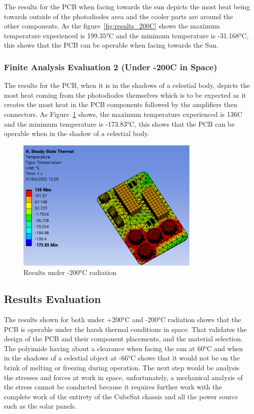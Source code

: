 The results for the PCB when facing towards the sun
depicts the most heat being towards outside of the photodiodes area and
the cooler parts are around the other components. As the figure~\ref{fig:results_200C}
shows the maximum temperature experienced is 199.35°C and the minimum
temperature is -31.168°C, this shows that the PCB can be operable when
facing towards the Sun.




\subsubsection{Finite Analysis Evaluation 2 (Under -200C in Space)}

The results for the PCB, when it is in the shadows of a celestial body, depicts the most heat coming from the photodiodes themselves which is to be expected as it creates the most heat in the PCB components followed by the amplifiers then connectors. As Figure~\ref{fig:results_minus_200C}  shows, the maximum temperature experienced is 136C and the minimum temperature is -173.83°C, this shows that the PCB can be operable when in the shadow of a celestial body.

\begin{figure}[htbp]
    \centering
    \includegraphics[width=0.8\textwidth]{chapters/methodology/ThermalAnalysis/Fig3underneg200c.png}
    \caption{Results under -200°C radiation}
    \label{fig:results_minus_200C}
\end{figure}

\subsection{Results Evaluation}

The results shown for both under +200°C and -200°C radiation shows that
the PCB is operable under the harsh thermal conditions in space. That
validates the design of the PCB and their component placements, and the
material selection. The polyimide having about a clearance when facing
the sun at 60°C and when in the shadows of a celestial object at -66°C
shows that it would not be on the brink of melting or freezing during
operation. The next step would be analysis the stresses and forces at
work in space, unfortunately, a mechanical analysis of the stress cannot
be conducted because it requires further work with the complete work of
the entirety of the CubeSat chassis and all the power source such as the
solar panels.

